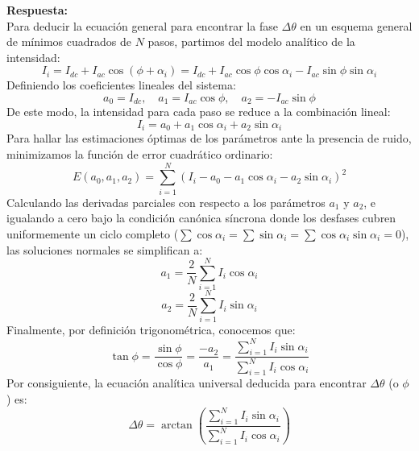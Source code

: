 \documentclass[12pt,letterpaper]{article}
\begin{document}
\begin{enumerate}
		\vspace{0.3cm}
		\textbf{Respuesta:} \\
		Para deducir la ecuación general para encontrar la fase $\Delta\theta$ en un esquema general de mínimos cuadrados de $N$ pasos, partimos del modelo analítico de la intensidad:
		\[ I_i = I_{dc} + I_{ac}\cos(\phi + \alpha_i) = I_{dc} + I_{ac}\cos\phi\cos\alpha_i - I_{ac}\sin\phi\sin\alpha_i \]
		Definiendo los coeficientes lineales del sistema:
		\[ a_0 = I_{dc}, \quad a_1 = I_{ac}\cos\phi, \quad a_2 = -I_{ac}\sin\phi \]
		De este modo, la intensidad para cada paso se reduce a la combinación lineal:
		\[ I_i = a_0 + a_1\cos\alpha_i + a_2\sin\alpha_i \]
		Para hallar las estimaciones óptimas de los parámetros ante la presencia de ruido, minimizamos la función de error cuadrático ordinario:
		\[ E(a_0, a_1, a_2) = \sum_{i=1}^N (I_i - a_0 - a_1\cos\alpha_i - a_2\sin\alpha_i)^2 \]
		Calculando las derivadas parciales con respecto a los parámetros $a_1$ y $a_2$, e igualando a cero bajo la condición canónica síncrona donde los desfases cubren uniformemente un ciclo completo ($\sum\cos\alpha_i = \sum\sin\alpha_i = \sum\cos\alpha_i\sin\alpha_i = 0$), las soluciones normales se simplifican a:
		\[ a_1 = \frac{2}{N}\sum_{i=1}^N I_i\cos\alpha_i \]
		\[ a_2 = \frac{2}{N}\sum_{i=1}^N I_i\sin\alpha_i \]
		Finalmente, por definición trigonométrica, conocemos que:
		\[ \tan\phi = \frac{\sin\phi}{\cos\phi} = \frac{-a_2}{a_1} = \frac{\sum_{i=1}^N I_i\sin\alpha_i}{\sum_{i=1}^N I_i\cos\alpha_i} \]
		Por consiguiente, la ecuación analítica universal deducida para encontrar $\Delta\theta$ (o $\phi$) es:
		\[ \Delta\theta = \arctan\left( \frac{\sum_{i=1}^N I_i\sin\alpha_i}{\sum_{i=1}^N I_i\cos\alpha_i} \right) \]
		
	\end{enumerate}
	
\end{document}
